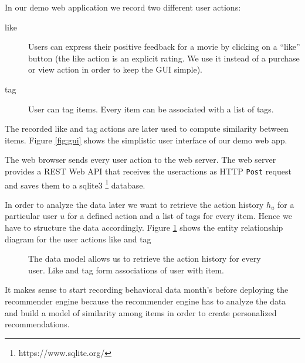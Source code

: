 In our demo web application we record two different user actions:
\begin{description}
\item[like]  Users can express their positive feedback for a movie by clicking on a ``like'' button (the \gls{like} action is an explicit rating. We use it instead of a purchase or view action in order to keep the GUI simple).
\item[tag] User can \gls{tag} items. Every item can be associated with a list of \glspl{tag}.
\end{description}
The recorded like and tag actions are later used to compute similarity between items.
Figure \ref{fig:gui} shows the simplistic user interface of our demo web app.

The web browser sends every user action to the web server. The web server provides a REST Web API that receives the \glspl{useraction} as HTTP \verb|Post| request and saves them to a sqlite3 \footnote{https://www.sqlite.org/} database.

In order to analyze the data later we want to retrieve the action history $h_u$ for a particular user $u$ for a defined action and a list of tags for every item. Hence we have to structure the data accordingly. Figure \ref{fig:er} shows the entity relationship diagram for the user actions \gls{like} and \gls{tag}


\begin{figure}
\centering
{}
\caption{The data model allows us to retrieve the action history for every user. Like and tag form associations of user with item.}
\label{fig:er}
\end{figure}

It makes sense to start recording behavioral data month's before deploying the recommender engine because the recommender engine has to analyze the data and build a model of similarity among items in order to create personalized recommendations.

